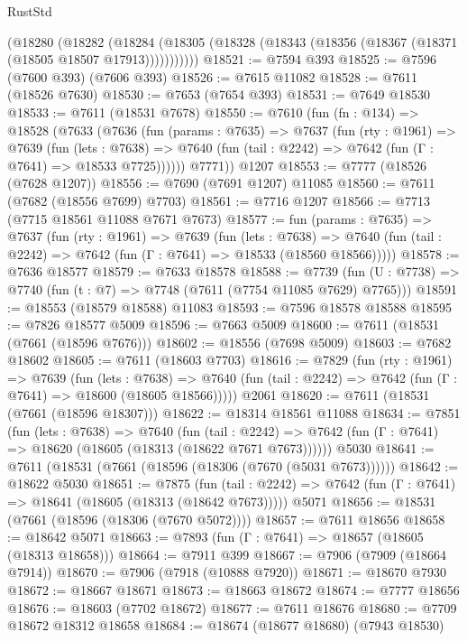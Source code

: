 \begin{lexlean}{RustStd}
\begin{coremodule}
{\begin{coremodule}
{{{{{{{{{{{{{{{{{{{{{{{{{{{{{{{{{{      (@18280
        (@18282
          (@18284 (@18305 (@18328 (@18343 (@18356 (@18367 (@18371 (@18505 @18507 @17913)))))))))))
@18521 := @7594 @393
@18525 := @7596 (@7600 @393) (@7606 @393)
@18526 := @7615 @11082
@18528 := @7611 (@18526 @7630)
@18530 := @7653 (@7654 @393)
@18531 := @7649 @18530
@18533 := @7611 (@18531 @7678)
@18550 := @7610
    (fun (fn : @134) =>
    @18528
      (@7633
        (@7636
          (fun (params : @7635) =>
          @7637
            (fun (rty : @1961) =>
            @7639
              (fun (lets : @7638) =>
              @7640 (fun (tail : @2242) => @7642 (fun (Γ : @7641) => @18533 @7725))))))
        @7771))
    @1207
@18553 := @7777 (@18526 (@7628 @1207))
@18556 := @7690 (@7691 @1207) @11085
@18560 := @7611 (@7682 (@18556 @7699) @7703)
@18561 := @7716 @1207
@18566 := @7713 (@7715 @18561 @11088 @7671 @7673)
@18577 := fun (params : @7635) =>
  @7637
    (fun (rty : @1961) =>
    @7639
      (fun (lets : @7638) =>
      @7640 (fun (tail : @2242) => @7642 (fun (Γ : @7641) => @18533 (@18560 @18566)))))
@18578 := @7636 @18577
@18579 := @7633 @18578
@18588 := @7739
    (fun (U : @7738) => @7740 (fun (t : @7) => @7748 (@7611 (@7754 @11085 @7629) @7765)))
@18591 := @18553 (@18579 @18588) @11083
@18593 := @7596 @18578 @18588
@18595 := @7826 @18577 @5009
@18596 := @7663 @5009
@18600 := @7611 (@18531 (@7661 (@18596 @7676)))
@18602 := @18556 (@7698 @5009)
@18603 := @7682 @18602
@18605 := @7611 (@18603 @7703)
@18616 := @7829
    (fun (rty : @1961) =>
    @7639
      (fun (lets : @7638) =>
      @7640 (fun (tail : @2242) => @7642 (fun (Γ : @7641) => @18600 (@18605 @18566)))))
    @2061
@18620 := @7611 (@18531 (@7661 (@18596 @18307)))
@18622 := @18314 @18561 @11088
@18634 := @7851
    (fun (lets : @7638) =>
    @7640
      (fun (tail : @2242) =>
      @7642 (fun (Γ : @7641) => @18620 (@18605 (@18313 (@18622 @7671 @7673))))))
    @5030
@18641 := @7611 (@18531 (@7661 (@18596 (@18306 (@7670 (@5031 @7673))))))
@18642 := @18622 @5030
@18651 := @7875
    (fun (tail : @2242) => @7642 (fun (Γ : @7641) => @18641 (@18605 (@18313 (@18642 @7673)))))
    @5071
@18656 := @18531 (@7661 (@18596 (@18306 (@7670 @5072))))
@18657 := @7611 @18656
@18658 := @18642 @5071
@18663 := @7893 (fun (Γ : @7641) => @18657 (@18605 (@18313 @18658)))
@18664 := @7911 @399
@18667 := @7906 (@7909 (@18664 @7914))
@18670 := @7906 (@7918 (@10888 @7920))
@18671 := @18670 @7930
@18672 := @18667 @18671
@18673 := @18663 @18672
@18674 := @7777 @18656
@18676 := @18603 (@7702 @18672)
@18677 := @7611 @18676
@18680 := @7709 @18672 @18312 @18658
@18684 := @18674 (@18677 @18680) (@7943 @18530)
}}}}}}}}}}}}}}}}}}}}}}}}}}}}}}}}}}
\end{coremodule}}
\end{coremodule}
\end{lexlean}
